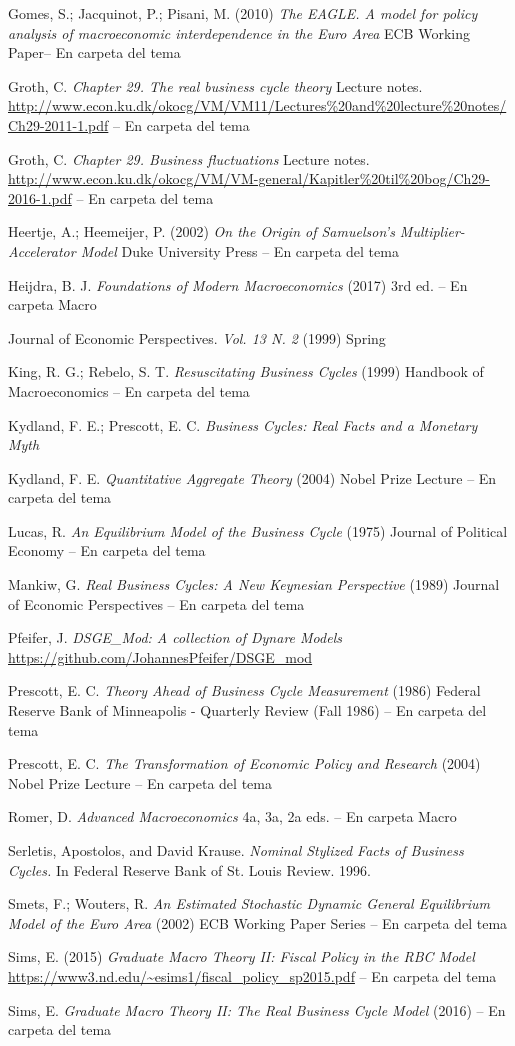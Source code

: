 \documentclass{nuevotema}
\begin{document}
Gomes, S.; Jacquinot, P.; Pisani, M. (2010) \textit{The EAGLE. A model for policy analysis of macroeconomic interdependence in the Euro Area} ECB Working Paper-- En carpeta del tema

Groth, C. \textit{Chapter 29. The real business cycle theory} Lecture notes. \url{http://www.econ.ku.dk/okocg/VM/VM11/Lectures\%20and\%20lecture\%20notes/Ch29-2011-1.pdf} -- En carpeta del tema

Groth, C. \textit{Chapter 29. Business fluctuations} Lecture notes. \url{http://www.econ.ku.dk/okocg/VM/VM-general/Kapitler\%20til\%20bog/Ch29-2016-1.pdf} -- En carpeta del tema


Heertje, A.; Heemeijer, P. (2002) \textit{On the Origin of Samuelson's Multiplier-Accelerator Model} Duke University Press -- En carpeta del tema

Heijdra, B. J. \textit{Foundations of Modern Macroeconomics} (2017) 3rd ed. -- En carpeta Macro

Journal of Economic Perspectives. \textit{Vol. 13 N. 2} (1999) Spring

King, R. G.; Rebelo, S. T. \textit{Resuscitating Business Cycles} (1999) Handbook of Macroeconomics -- En carpeta del tema

Kydland, F. E.; Prescott, E. C. \textit{Business Cycles: Real Facts and a Monetary Myth}

Kydland, F. E. \textit{Quantitative Aggregate Theory} (2004) Nobel Prize Lecture -- En carpeta del tema

Lucas, R. \textit{An Equilibrium Model of the Business Cycle} (1975) Journal of Political Economy -- En carpeta del tema

Mankiw, G. \textit{Real Business Cycles: A New Keynesian Perspective} (1989) Journal of Economic Perspectives -- En carpeta del tema

Pfeifer, J. \textit{DSGE\_Mod: A collection of Dynare Models} \url{https://github.com/JohannesPfeifer/DSGE_mod}

Prescott, E. C. \textit{Theory Ahead of Business Cycle Measurement} (1986) Federal Reserve Bank of Minneapolis - Quarterly Review (Fall 1986) -- En carpeta del tema

Prescott, E. C. \textit{The Transformation of Economic Policy and Research} (2004) Nobel Prize Lecture -- En carpeta del tema

Romer, D. \textit{Advanced Macroeconomics} 4a, 3a, 2a eds. -- En carpeta Macro

Serletis, Apostolos, and David Krause. \textit{Nominal Stylized Facts of Business Cycles.} In Federal Reserve Bank of St. Louis Review. 1996.

Smets, F.; Wouters, R. \textit{An Estimated Stochastic Dynamic General Equilibrium Model of the Euro Area} (2002) ECB Working Paper Series -- En carpeta del tema

Sims, E. (2015) \textit{Graduate Macro Theory II: Fiscal Policy in the RBC Model} \url{https://www3.nd.edu/~esims1/fiscal_policy_sp2015.pdf} -- En carpeta del tema

Sims, E. \textit{Graduate Macro Theory II: The Real Business Cycle Model} (2016) -- En carpeta del tema
\end{document}
